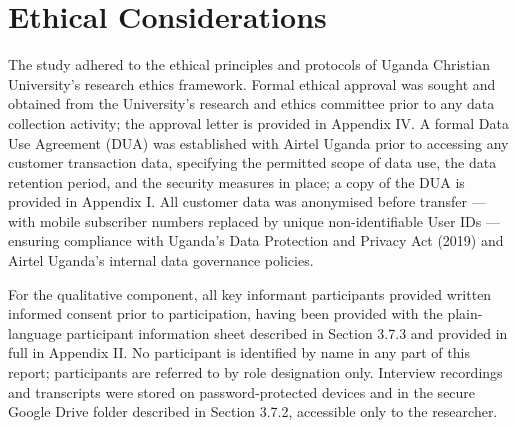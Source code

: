 \section{Ethical Considerations}

The study adhered to the ethical principles and protocols of Uganda Christian University's research ethics framework. Formal ethical approval was sought and obtained from the University's research and ethics committee prior to any data collection activity; the approval letter is provided in Appendix IV. A formal Data Use Agreement (DUA) was established with Airtel Uganda prior to accessing any customer transaction data, specifying the permitted scope of data use, the data retention period, and the security measures in place; a copy of the DUA is provided in Appendix I. All customer data was anonymised before transfer --- with mobile subscriber numbers replaced by unique non-identifiable User IDs --- ensuring compliance with Uganda's Data Protection and Privacy Act (2019) and Airtel Uganda's internal data governance policies.

For the qualitative component, all key informant participants provided written informed consent prior to participation, having been provided with the plain-language participant information sheet described in Section 3.7.3 and provided in full in Appendix II. No participant is identified by name in any part of this report; participants are referred to by role designation only. Interview recordings and transcripts were stored on password-protected devices and in the secure Google Drive folder described in Section 3.7.2, accessible only to the researcher.
